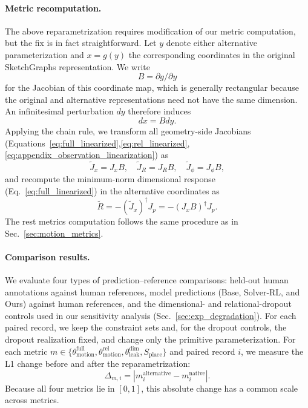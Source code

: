 \paragraph{Metric recomputation.}
The above reparametrization requires modification of our metric computation, but the fix is in fact straightforward.
Let $y$ denote either alternative parameterization and $x = g(y)$ the corresponding coordinates in the original SketchGraphs representation. We write
\begin{equation}
B = \partial g / \partial y
\end{equation}
for the Jacobian of this coordinate map, which is generally rectangular because the original and alternative representations need not have the same dimension. An infinitesimal perturbation $dy$ therefore induces
\begin{equation}
dx = B dy.
\end{equation}
Applying the chain rule, we transform all geometry-side Jacobians (Equations~\ref{eq:full_linearized},\ref{eq:rel_linearized},\ref{eq:appendix_observation_linearization}) as
\begin{equation}
\widetilde{J}_x = J_x B,\quad
\widetilde{J}_R = J_R B,\quad
\widetilde{J}_\phi = J_\phi B,
\end{equation}
and recompute the minimum-norm dimensional response (Eq.~\ref{eq:full_linearized}) in the alternative coordinates as
\begin{equation}
\widetilde{R} = -(\widetilde{J}_x)^\dagger J_p = -(J_x B)^\dagger J_p.
\end{equation}
The rest metrics computation follows the same procedure as in Sec.~\ref{sec:motion_metrics}.

\paragraph{Comparison results.}
We evaluate four types of prediction--reference comparisons: held-out human annotations against human references, model predictions (Base, Solver-RL, and Ours) against human references, and the dimensional- and relational-dropout controls used in our sensitivity analysis (Sec.~\ref{sec:exp_degradation}). For each paired record, we keep the constraint sets and, for the dropout controls, the dropout realization fixed, and change only the primitive parameterization. For each metric $m\in\{\theta_\mathrm{motion}^\mathrm{full}, \theta_\mathrm{motion}^\mathrm{rel}, \theta_\mathrm{leak}^\mathrm{dim}, S_\mathrm{place}\}$ and paired record $i$, we measure the L1 change before and after the reparametrization:
\begin{equation}
    \Delta_{m,i} = |m_i^\mathrm{alternative} - m_i^\mathrm{native}|.
    \label{eq:appendix_alternative_native_diff_metric}
\end{equation}
Because all four metrics lie in $[0,1]$, this absolute change has a common scale across metrics.

